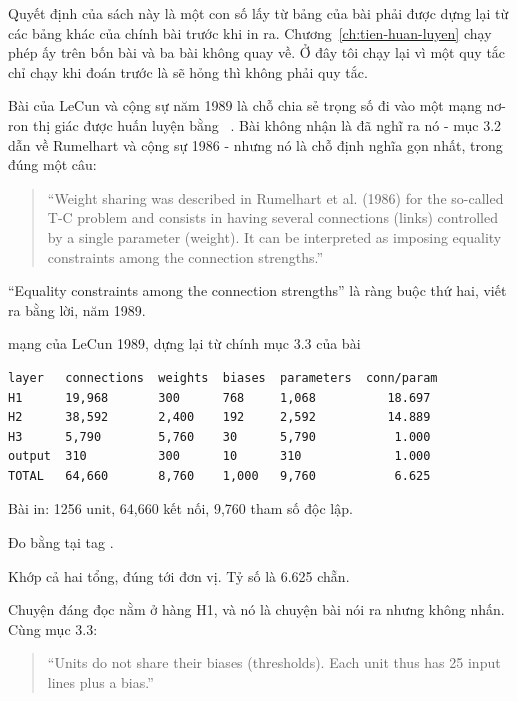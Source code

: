 %
Quyết định của sách này là một con số lấy từ bảng của bài phải được dựng lại từ
các bảng khác của chính bài trước khi in ra. Chương~\ref{ch:tien-huan-luyen}
chạy phép ấy trên bốn bài và ba bài không quay về. Ở đây tôi chạy lại vì một
quy tắc chỉ chạy khi đoán trước là sẽ hỏng thì không phải quy tắc.

Bài của LeCun và cộng sự năm 1989 là chỗ chia sẻ trọng số đi vào một mạng
nơ-ron thị giác được huấn luyện bằng
~\autocite{lecun1989zipcode}. Bài không
nhận là đã nghĩ ra nó - mục 3.2 dẫn về Rumelhart và cộng sự 1986 - nhưng nó là
chỗ định nghĩa gọn nhất, trong đúng một câu:

\begin{quote}
\enquote{Weight sharing was described in Rumelhart et al. (1986) for the
so-called T-C problem and consists in having several connections (links)
controlled by a single parameter (weight). It can be interpreted as imposing
equality constraints among the connection strengths.}
\end{quote}

\enquote{Equality constraints among the connection strengths} là ràng buộc thứ
hai, viết ra bằng lời, năm 1989.

\begin{measured}{mạng của LeCun 1989, dựng lại từ chính mục 3.3 của bài}
\begin{verbatim}
layer   connections  weights  biases  parameters  conn/param
H1      19,968       300      768     1,068          18.697
H2      38,592       2,400    192     2,592          14.889
H3      5,790        5,760    30      5,790           1.000
output  310          300      10      310             1.000
TOTAL   64,660       8,760    1,000   9,760           6.625
\end{verbatim}

Bài in: 1256 unit, 64,660 kết nối, 9,760 tham số độc lập.

Đo bằng  tại tag .
\end{measured}

Khớp cả hai tổng, đúng tới đơn vị. Tỷ số là 6.625 chẵn.

Chuyện đáng đọc nằm ở hàng H1, và nó là chuyện bài nói ra nhưng không nhấn.
Cùng mục 3.3:

\begin{quote}
\enquote{Units do not share their biases (thresholds). Each unit thus has 25
input lines plus a bias.}
\end{quote}

